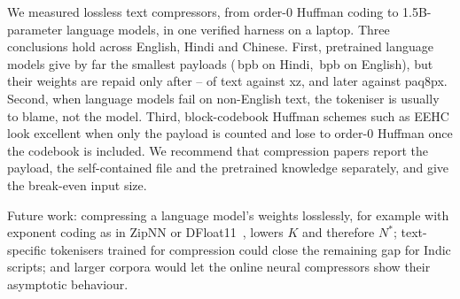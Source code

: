 We measured \NumMethods{} lossless text compressors, from order-0 Huffman coding to 1.5B-parameter language models, in one verified harness on a laptop. Three conclusions hold across English, Hindi and Chinese. First, pretrained language models give by far the smallest payloads (\NumSQlHi{}\,bpb on Hindi, \NumSQlEn{}\,bpb on English), but their weights are repaid only after \NumBreakEvenSmall{}--\NumBreakEvenLarge{} of text against xz, and later against paq8px. Second, when language models fail on non-English text, the tokeniser is usually to blame, not the model. Third, block-codebook Huffman schemes such as EEHC look excellent when only the payload is counted and lose to order-0 Huffman once the codebook is included. We recommend that compression papers report the payload, the self-contained file and the pretrained knowledge separately, and give the break-even input size.

Future work: compressing a language model's weights losslessly, for example with exponent coding as in ZipNN or DFloat11~\cite{hershcovitch2024zipnn,zhang2025dfloat11}, lowers $K$ and therefore $N^\ast$; text-specific tokenisers trained for compression could close the remaining gap for Indic scripts; and larger corpora would let the online neural compressors show their asymptotic behaviour.

